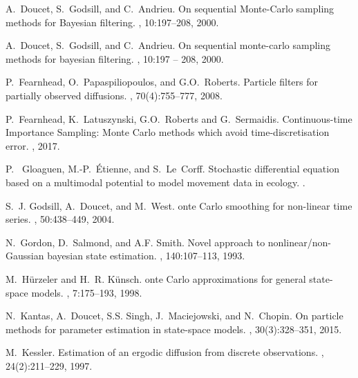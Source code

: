 \documentclass[12pt]{article}
\newcommand{\1}{\mathrm{1}}
\begin{document}
\begin{thebibliography}{10}
A.~Doucet, S.~Godsill, and C.~Andrieu.
\newblock On sequential {M}onte-{C}arlo sampling methods for {B}ayesian
  filtering.
, 10:197--208, 2000.

A.~Doucet, S.~Godsill, and C.~Andrieu.
\newblock On sequential monte-carlo sampling methods for bayesian filtering.
, 10:197 -- 208, 2000.

P.~Fearnhead, O.~Papaspiliopoulos, and G.O.~Roberts.
\newblock Particle filters for partially observed diffusions.
, 70(4):755--777, 2008.

P.~Fearnhead, K.~Latuszynski, G.O.~Roberts and G.~Sermaidis.
\newblock Continuous-time Importance Sampling: {M}onte {C}arlo methods which avoid time-discretisation error.
, 2017.

P.~ Gloaguen, M.-P.~\'Etienne, and S.~Le~Corff.
\newblock Stochastic differential equation based on a multimodal potential to model movement data in ecology.
.

S.~J. Godsill, A.~Doucet, and M.~West.
onte {C}arlo smoothing for non-linear time series.
, 50:438--449, 2004.

N.~Gordon, D.~Salmond, and A.F. Smith.
\newblock Novel approach to nonlinear/non-{G}aussian bayesian state estimation.
, 140:107--113, 1993.

M.~H{\"u}rzeler and H.~R. K{\"u}nsch.
onte {C}arlo approximations for general state-space models.
, 7:175--193, 1998.

N.~Kantas, A.~Doucet, S.S. Singh, J.~Maciejowski, and N.~Chopin.
\newblock On particle methods for parameter estimation in state-space models.
, 30(3):328--351, 2015.

M.~Kessler.
\newblock Estimation of an ergodic diffusion from discrete observations.
, 24(2):211--229, 1997.


\end{thebibliography}
\end{document}
